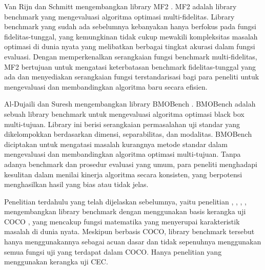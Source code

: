 Van Rijn dan Schmitt mengembangkan library MF2 \citep{van_Rijn_2020}. MF2 adalah library benchmark yang mengevaluasi algoritma optimasi multi-fidelitas. Library benchmark yang sudah ada sebelumnya kebanyakan hanya berfokus pada fungsi fidelitas-tunggal, yang kemungkinan tidak cukup mewakili kompleksitas masalah optimasi di dunia nyata yang melibatkan berbagai tingkat akurasi dalam fungsi evaluasi. Dengan memperkenalkan serangkaian fungsi benchmark multi-fidelitas, MF2 bertujuan untuk mengatasi keterbatasan benchmark fidelitas-tunggal yang ada dan menyediakan serangkaian fungsi terstandarisasi bagi para peneliti untuk mengevaluasi dan membandingkan algoritma baru secara efisien.

Al-Dujaili dan Suresh mengembangkan library BMOBench \citep{al-dujaili_2016}. BMOBench adalah sebuah library benchmark untuk mengevaluasi algoritma optimasi black box multi-tujuan. Library ini berisi serangkaian permasalahan uji standar yang dikelompokkan berdasarkan dimensi, separabilitas, dan modalitas. BMOBench diciptakan untuk mengatasi masalah kurangnya metode standar dalam mengevaluasi dan membandingkan algoritma optimasi multi-tujuan. Tanpa adanya benchmark dan prosedur evaluasi yang umum, para peneliti menghadapi kesulitan dalam menilai kinerja algoritma secara konsisten, yang berpotensi menghasilkan hasil yang bias atau tidak jelas.

Penelitian terdahulu yang telah dijelaskan sebelumnya, yaitu penelitian \citep{Bliek_2023}, \citep{ma_zeyan_guo_chen_jiacheng_zhenrui_peng_gong_ma_cao_2023}, \citep{van_Rijn_2020}, \citep{al-dujaili_2016}, mengembangkan library benchmark dengan menggunakan basis kerangka uji COCO \citep{hansen2021coco}, yang mencakup fungsi matematika yang menyerupai karakteristik masalah di dunia nyata. Meskipun berbasis COCO, library benchmark tersebut hanya menggunakannya sebagai acuan dasar \citep{ma_zeyan_guo_chen_jiacheng_zhenrui_peng_gong_ma_cao_2023} dan tidak sepenuhnya menggunakan semua fungsi uji yang terdapat dalam COCO. Hanya penelitian \citep{Van_Thieu_2024} yang menggunakan kerangka uji CEC.

